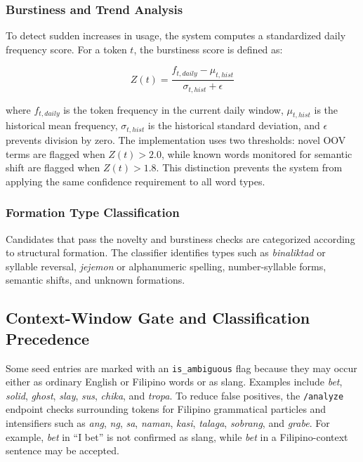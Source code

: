 \subsubsection{Burstiness and Trend Analysis}
To detect sudden increases in usage, the system computes a standardized daily frequency score. For a token $t$, the burstiness score is defined as:

\begin{equation}
Z(t) = \frac{f_{t,daily} - \mu_{t,hist}}{\sigma_{t,hist} + \epsilon}
\end{equation}

\noindent where $f_{t,daily}$ is the token frequency in the current daily window, $\mu_{t,hist}$ is the historical mean frequency, $\sigma_{t,hist}$ is the historical standard deviation, and $\epsilon$ prevents division by zero. The implementation uses two thresholds: novel OOV terms are flagged when $Z(t) > 2.0$, while known words monitored for semantic shift are flagged when $Z(t) > 1.8$. This distinction prevents the system from applying the same confidence requirement to all word types.

\subsubsection{Formation Type Classification}
Candidates that pass the novelty and burstiness checks are categorized according to structural formation. The classifier identifies types such as \textit{binaliktad} or syllable reversal, \textit{jejemon} or alphanumeric spelling, number-syllable forms, semantic shifts, and unknown formations.

\subsection{Context-Window Gate and Classification Precedence}
Some seed entries are marked with an \texttt{is\_ambiguous} flag because they may occur either as ordinary English or Filipino words or as slang. Examples include \textit{bet}, \textit{solid}, \textit{ghost}, \textit{slay}, \textit{sus}, \textit{chika}, and \textit{tropa}. To reduce false positives, the \texttt{/analyze} endpoint checks surrounding tokens for Filipino grammatical particles and intensifiers such as \textit{ang}, \textit{ng}, \textit{sa}, \textit{naman}, \textit{kasi}, \textit{talaga}, \textit{sobrang}, and \textit{grabe}. For example, \textit{bet} in ``I bet'' is not confirmed as slang, while \textit{bet} in a Filipino-context sentence may be accepted.

